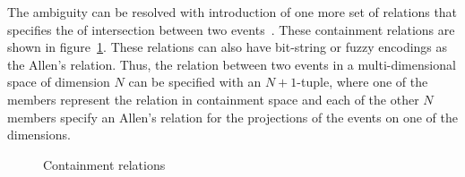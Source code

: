 The ambiguity can be resolved with introduction of one more set of relations that specifies the of intersection between two 
events~\citep{Wattamwar:2008}. These containment relations are shown in figure~\ref{fig:clock:containment}. These relations
can also have bit-string or fuzzy encodings as the Allen's relation. Thus, the relation between two events in a multi-dimensional 
space of dimension $N$ can be specified with an $N+1$-tuple, where one of the members represent the relation in containment 
space and each of the other $N$ members specify an Allen's relation for the  projections of the events on one of the dimensions.

\begin{figure}[htbp!]
	\centerline{
	}
	\caption{Containment relations}
	\label{fig:clock:containment}
\end{figure}
